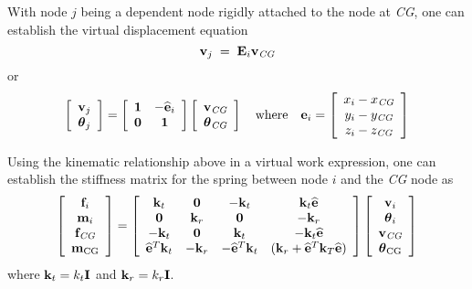 With node $j$ being a dependent node rigidly attached to the node at \textit{CG},
one can establish the virtual displacement equation
%
\begin{equation}
{\bf v}_j \;=\; {\bf E}_i {\bf v}_\textit{CG}
\end{equation}
or
\begin{equation}
\left[\begin{array}{c}
{\bf v}_j \\ {\boldsymbol{\theta}}_j \end{array}\right] =
\left[\begin{array}{cc}
{\bf 1} & -\widehat{\bf e}_i \\
{\bf 0} & {\bf 1}
\end{array}\right]
\left[\begin{array}{c}
{\bf v}_\textit{CG} \\ {\boldsymbol{\theta}}_\textit{CG} \end{array}\right]
\quad\text{where}\quad
{\bf e}_i = \left[\begin{array}{c}
x_i - x_\textit{CG} \\
y_i - y_\textit{CG} \\
z_i - z_\textit{CG}
\end{array}\right]
\label{eq:rigDispEcc}
\end{equation}

Using the kinematic relationship above in a virtual work expression,
one can establish the stiffness matrix for the spring between node $i$
and the \textit{CG} node as
%
\begin{equation}
\left[\begin{array}{c}
{\bf f}_i \\ {\bf m}_i \\ {\bf f}_\textit{CG} \\ {\bf m}_\text{CG} \\
\end{array}\right]
=
\left[\begin{array}{cccc}
 {\bf k}_t                   &  {\bf 0}    & -{\bf k}_t &  {\bf k}_t \widehat{{\bf e}} \\
 {\bf 0}                     &  {\bf k}_r  &  {\bf 0}   & -{\bf k}_r \\
-{\bf k}_t                   &  {\bf 0}    &  {\bf k}_t & -{\bf k}_t \widehat{{\bf e}} \\
 \widehat{\bf e}^T {\bf k}_t & -{\bf k}_r  & -\widehat{\bf e}^T {\bf k}_t &
 ({\bf k}_r + \widehat{\bf e}^T{\bf k}_T \widehat{\bf e}) \\
\end{array}\right]
\left[\begin{array}{c}
{\bf v}_i \\ {\boldsymbol{\theta}}_i \\ {\bf v}_\textit{CG} \\ {\boldsymbol{\theta}}_\text{CG} \\
\end{array}\right]
\end{equation}
%
where ${\bf k}_t = k_t{\bf I}$ and ${\bf k}_r = k_r{\bf I}$.

